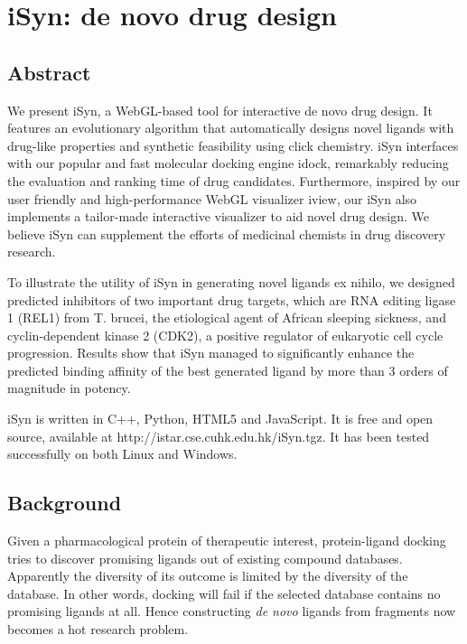 \chapter{iSyn: de novo drug design}

\section{Abstract}

We present iSyn, a WebGL-based tool for interactive de novo drug design. It features an evolutionary algorithm that automatically designs novel ligands with drug-like properties and synthetic feasibility using click chemistry. iSyn interfaces with our popular and fast molecular docking engine idock, remarkably reducing the evaluation and ranking time of drug candidates. Furthermore, inspired by our user friendly and high-performance WebGL visualizer iview, our iSyn also implements a tailor-made interactive visualizer to aid novel drug design. We believe iSyn can supplement the efforts of medicinal chemists in drug discovery research.

To illustrate the utility of iSyn in generating novel ligands ex nihilo, we designed predicted inhibitors of two important drug targets, which are RNA editing ligase 1 (REL1) from T. brucei, the etiological agent of African sleeping sickness, and cyclin-dependent kinase 2 (CDK2), a positive regulator of eukaryotic cell cycle progression. Results show that iSyn managed to significantly enhance the predicted binding affinity of the best generated ligand by more than 3 orders of magnitude in potency.

iSyn is written in C++, Python, HTML5 and JavaScript. It is free and open source, available at http://istar.cse.cuhk.edu.hk/iSyn.tgz. It has been tested successfully on both Linux and Windows.

\section{Background}

Given a pharmacological protein of therapeutic interest, protein-ligand docking tries to discover promising ligands out of existing compound databases. Apparently the diversity of its outcome is limited by the diversity of the database. In other words, docking will fail if the selected database contains no promising ligands at all. Hence constructing \textit{de novo} ligands from fragments now becomes a hot research problem.

